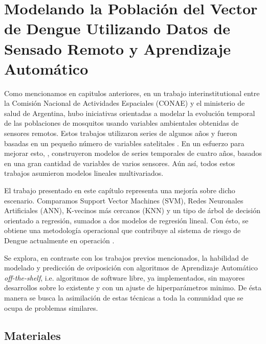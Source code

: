 


\justifying
\chapter{Modelando la Población del Vector de Dengue Utilizando Datos de Sensado Remoto y Aprendizaje Automático}

  \par Como mencionamos en capitulos anteriores, en un trabajo interinstitutional entre
    la Comisión Nacional de Actividades Espaciales (CONAE) y el ministerio de salud
    de Argentina, hubo iniciativas orientadas a modelar la evolución temporal de
    las poblaciones de mosquitos usando variables ambientales obtenidas de
    sensores remotos. Estos trabajos utilizaron series de algunos años y fueron
    basadas en un pequeño número de variables satelitales \cite{ndwi_erffectiveness, modis_data}.
    En un esfuerzo para mejorar esto, \cite{temporal_modeling}, construyeron modelos
    de series temporales de cuatro años, basados en una gran cantidad de variables
    de varios sensores.
    Aún así, todos estos trabajos asumieron modelos lineales multivariados.

  \par El trabajo presentado en este capítulo representa una mejoría sobre
    dicho escenario. Comparamos
    Support Vector Machines (SVM), Redes Neuronales Artificiales (ANN),
    K-vecinos más cercanos (KNN) y un tipo de árbol de decisión orientado a
    regresión, sumados a dos modelos de regresión lineal. Con ésto, se
    obtiene una metodología operacional que contribuye al sistema de riesgo
    de Dengue actualmente en operación \cite{porcasi_operative, analisis_cordoba}.

  \par Se explora, en contraste con los trabajos previos mencionados, la habilidad
    de modelado y predicción de oviposición con algoritmos de Aprendizaje
    Automático \textit{off-the-shelf}, i.e. algoritmos de software libre, ya
    implementados, sin mayores desarrollos sobre lo existente y con un ajuste de
    hiperparámetros minimo. De ésta manera se busca la asimilación de estas
    técnicas a toda la comunidad que se ocupa de problemas similares.


\section{Materiales}

